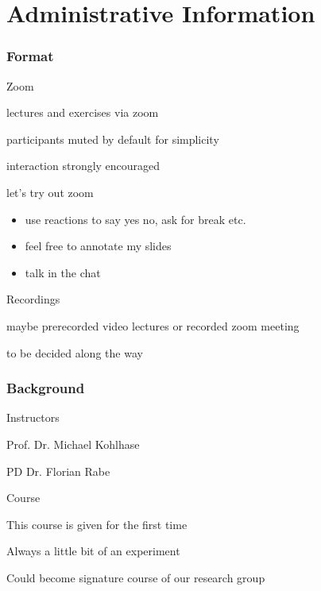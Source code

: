 \section{Administrative Information}

\begin{frame}\frametitle{Format}
\begin{blockitems}{Zoom}
\item lectures and exercises via zoom
\item participants muted by default for simplicity
\item interaction strongly encouraged
\item let's try out zoom
 \begin{itemize}
 \item use reactions to say yes no, ask for break etc.
 \item feel free to annotate my slides
 \item talk in the chat
 \end{itemize}
\end{blockitems}

\begin{blockitems}{Recordings}
\item maybe prerecorded video lectures or recorded zoom meeting
\item to be decided along the way
\end{blockitems}
\end{frame}


\begin{frame}\frametitle{Background}
\begin{blockitems}{Instructors}
\item Prof. Dr. Michael Kohlhase 
\item PD Dr. Florian Rabe 
\end{blockitems}

\begin{blockitems}{Course}
\item This course is given for the first time
\item Always a little bit of an experiment
\item Could become signature course of our research group 
\end{blockitems}
\end{frame}


